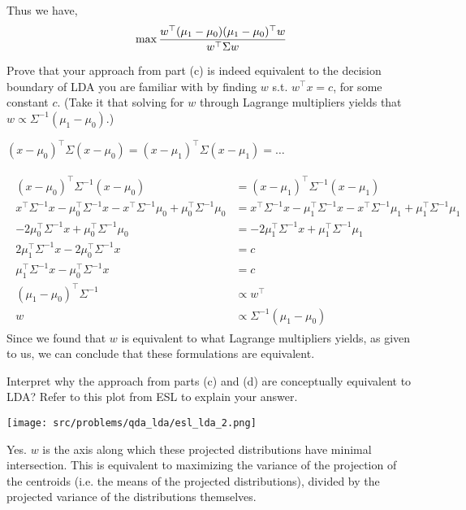 \begin{Parts}
\begin{solution}
Thus we have,
$$\max {w^\top (\mu_1 - \mu_0)(\mu_1 - \mu_0)^\top w \over w^\top \Sigma w}$$
\end{solution}

\Part Prove that your approach from part (c) is indeed equivalent to the decision boundary of LDA you are familiar with by
finding $w$ s.t. $w^\top x = c$, for some constant $c$.
(Take it that solving for $w$ through Lagrange multipliers yields that $w \propto \Sigma^{-1} (\mu_1-\mu_0)$.)

$(x-\mu_0)^\top \Sigma(x-\mu_0) = (x-\mu_1)^\top \Sigma(x-\mu_1) = \dots$

\begin{solution}
\begin{align*}
\begin{aligned}
(x-\mu_0)^\top \Sigma^{-1}(x-\mu_0) &= (x-\mu_1)^\top \Sigma^{-1}(x-\mu_1) \\
x^\top \Sigma^{-1} x - \mu_0^\top \Sigma^{-1} x - x^\top \Sigma^{-1} \mu_0 + \mu_0^\top \Sigma^{-1} \mu_0 &= x^\top \Sigma^{-1} x - \mu_1^\top \Sigma^{-1} x - x^\top \Sigma^{-1} \mu_1 + \mu_1^\top \Sigma^{-1} \mu_1\\
- 2\mu_0^\top \Sigma^{-1} x  + \mu_0^\top \Sigma^{-1} \mu_0 &= - 2\mu_1^\top \Sigma^{-1} x + \mu_1^\top \Sigma^{-1} \mu_1\\
2\mu_1^\top \Sigma^{-1} x- 2\mu_0^\top \Sigma^{-1} x  &=  c\\
\mu_1^\top \Sigma^{-1} x- \mu_0^\top \Sigma^{-1} x  &=  c\\
(\mu_1-\mu_0)^\top \Sigma^{-1} &\propto w^\top \\
w &\propto \Sigma^{-1}(\mu_1-\mu_0)
\end{aligned}
\end{align*}
Since we found that $w$ is equivalent to what Lagrange multipliers yields, as given to us, we can conclude that these formulations are equivalent.
\end{solution}

\Part Interpret why the approach from parts (c) and (d) are conceptually equivalent to LDA?
Refer to this plot from ESL to explain your answer.

\begin{center}
\texttt{[image: src/problems/qda\_lda/esl\_lda\_2.png]}
\end{center}

\begin{solution}
Yes. $w$ is the axis along which these projected distributions have minimal intersection.
This is equivalent to maximizing the variance of the projection of the centroids (i.e. the means of the projected distributions), divided by the projected variance of the distributions themselves.
\end{solution}

\end{Parts}
